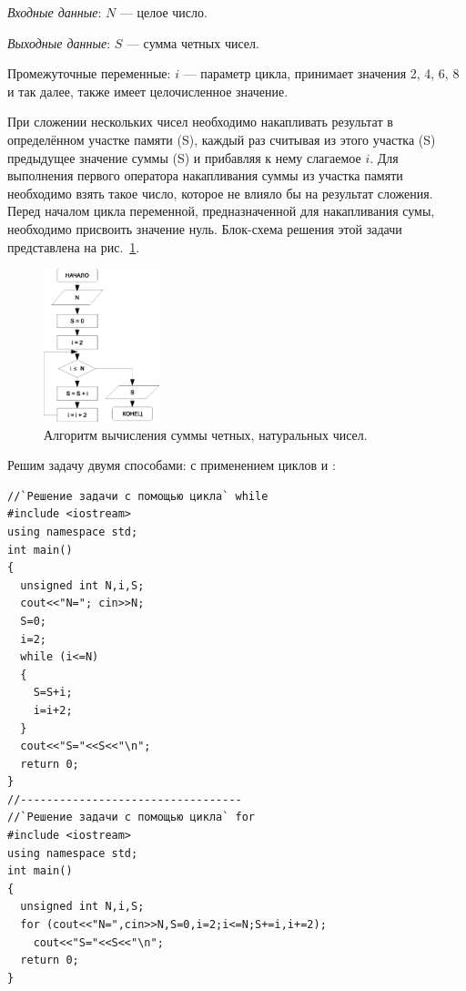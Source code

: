 
\emph{Входные данные}: $N$ --- целое число.

\emph{Выходные данные}: $S$ --- сумма четных чисел.

Промежуточные переменные: $i$ --- параметр цикла, принимает значения  2, 4, 6, 8 и так далее, также имеет
целочисленное значение.

При сложении нескольких чисел необходимо накапливать результат в определённом участке памяти (S), каждый раз считывая из
этого участка (S) предыдущее значение суммы (S) и прибавляя к нему слагаемое $i$. Для выполнения первого оператора
накапливания суммы из участка памяти необходимо взять такое число, которое не влияло бы на результат сложения. Перед
началом цикла переменной, предназначенной для накапливания сумы, необходимо присвоить значение нуль. Блок-схема решения
этой задачи представлена на рис.~\ref{ch03:refDrawing29}.

\begin{figure}[htb]
\begin{center}
\includegraphics[width=0.3\textwidth]{img/ris_3_30}
\caption{Алгоритм вычисления суммы четных, натуральных чисел.}
\label{ch03:refDrawing29}
\end{center}
\end{figure}

Решим задачу двумя способами: с применением циклов  и :

\begin{lstlisting}
//`Решение задачи с помощью цикла` while
#include <iostream>
using namespace std;
int main()
{
  unsigned int N,i,S;
  cout<<"N="; cin>>N;
  S=0;
  i=2;
  while (i<=N)
  {
    S=S+i;
    i=i+2;
  }
  cout<<"S="<<S<<"\n";
  return 0;
}
//----------------------------------
//`Решение задачи с помощью цикла` for
#include <iostream>
using namespace std;
int main()
{
  unsigned int N,i,S;
  for (cout<<"N=",cin>>N,S=0,i=2;i<=N;S+=i,i+=2);
    cout<<"S="<<S<<"\n";
  return 0;
}
\end{lstlisting}

